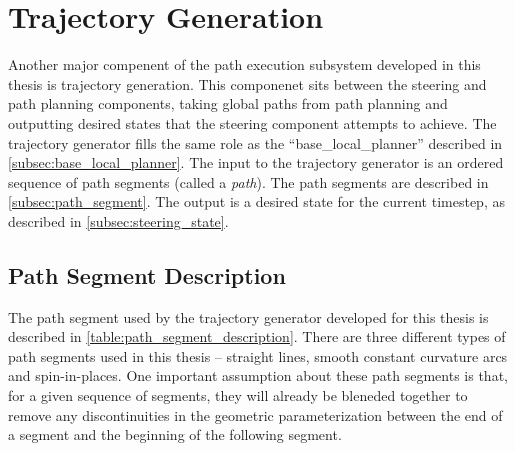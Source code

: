 \section{Trajectory Generation}\label{sec:trajectory_generation}

Another major compenent of the path execution subsystem developed in this thesis is trajectory generation. This componenet sits between the steering and path planning components, taking global paths from path planning and outputting desired states that the steering component attempts to achieve. The trajectory generator fills the same role as the ``base\_local\_planner'' described in \autoref{subsec:base_local_planner}. The input to the trajectory generator is an ordered sequence of path segments (called a \emph{path}). The path segments are described in \autoref{subsec:path_segment}. The output is a desired state for the current timestep, as described in \autoref{subsec:steering_state}.

\subsection{Path Segment Description}\label{subsec:path_segment}

The path segment used by the trajectory generator developed for this thesis is described in \autoref{table:path_segment_description}. There are three different types of path segments used in this thesis -- straight lines, smooth constant curvature arcs and spin-in-places. One important assumption about these path segments is that, for a given sequence of segments, they will already be bleneded together to remove any discontinuities in the geometric parameterization between the end of a segment and the beginning of the following segment.

